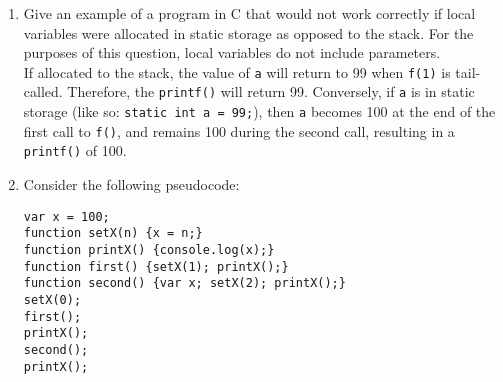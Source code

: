 \documentclass{article}
\begin{document}
\begin{enumerate}
\begin{enumerate}
\begin{verbatim}
    (function() {
      alert("Goodbye")
    }())
    \end{verbatim} \\
    This case is ambiguous because it seems as though \texttt{sayHello()} is a declaration, and the second function looks like it is being called. But, since there is no semicolon to break the first function definition, the parentheses around the second function act as a function call. It does not pass a value; instead, it calls a \texttt{void} function, which prints \texttt{"Goodbye"}. The script will print \texttt{"Goodbye"} first, and then \texttt{"Hello"}. Python does not run into this problem, because a function call has to be on the same line. The \texttt{NEWLINE} character will prevent anything that looks like a potential function call written on separate lines.
\end{enumerate}
\pagebreak
\item Give an example of a program in C that would not work correctly if local variables were allocated in static storage as opposed to the stack. For the purposes of this question, local variables do not include parameters.\\

If allocated to the stack, the value of \texttt{a} will return to 99 when \texttt{f(1)} is tail-called. Therefore, the  \texttt{printf()} will return 99. Conversely, if  \texttt{a} is in static storage (like so: \texttt{static int a = 99;}), then \texttt{a} becomes 100 at the end of the first call to \texttt{f()}, and remains 100 during the second call, resulting in a \texttt{printf()} of 100.
\pagebreak
\item Consider the following pseudocode:
\begin{verbatim}
var x = 100;
function setX(n) {x = n;}
function printX() {console.log(x);}
function first() {setX(1); printX();}
function second() {var x; setX(2); printX();}
setX(0);
first();
printX();
second();
printX();
\end{verbatim}


\end{enumerate}
\end{document}
